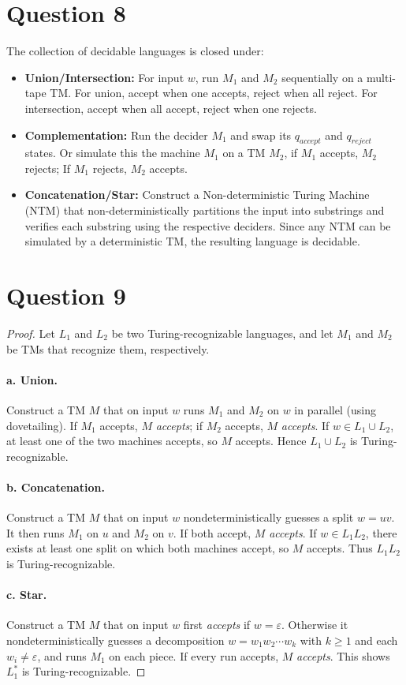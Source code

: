 \documentclass[a4paper, UTF-8]{article}
\theoremstyle{plain}
\begin{document}
\section{Question 8} 
The collection of decidable languages is closed under:
\begin{itemize}
    \item \textbf{Union/Intersection:} For input $w$, run $M_1$ and $M_2$ sequentially on a multi-tape TM. For union, accept when one accepts, reject when all reject. For intersection, accept when all accept, reject when one rejects.
    \item \textbf{Complementation:} Run the decider $M_1$ and swap its $q_{accept}$ and $q_{reject}$ states. Or simulate this the machine $M_1$ on a TM $M_2$, if $M_1$ accepts, $M_2$ rejects; If $M_1$ rejects, $M_2$ accepts.
    \item \textbf{Concatenation/Star:} Construct a Non-deterministic Turing Machine (NTM) that non-deterministically partitions the input into substrings and verifies each substring using the respective deciders. Since any NTM can be simulated by a deterministic TM, the resulting language is decidable.
\end{itemize}

\section{Question 9}

\begin{proof}
Let $L_1$ and $L_2$ be two Turing-recognizable languages, and let $M_1$ and $M_2$ be TMs that recognize them, respectively.

\paragraph{a. Union.}
Construct a TM $M$ that on input $w$ runs $M_1$ and $M_2$ on $w$ in parallel (using dovetailing). If $M_1$ accepts, $M$ \emph{accepts}; if $M_2$ accepts, $M$ \emph{accepts}. If $w \in L_1 \cup L_2$, at least one of the two machines accepts, so $M$ accepts. Hence $L_1 \cup L_2$ is Turing-recognizable.

\paragraph{b. Concatenation.}
Construct a TM $M$ that on input $w$ nondeterministically guesses a split $w = uv$. It then runs $M_1$ on $u$ and $M_2$ on $v$. If both accept, $M$ \emph{accepts}. If $w \in L_1 L_2$, there exists at least one split on which both machines accept, so $M$ accepts. Thus $L_1 L_2$ is Turing-recognizable.

\paragraph{c. Star.}
Construct a TM $M$ that on input $w$ first \emph{accepts} if $w = \varepsilon$. Otherwise it nondeterministically guesses a decomposition $w = w_1 w_2 \cdots w_k$ with $k \ge 1$ and each $w_i \neq \varepsilon$, and runs $M_1$ on each piece. If every run accepts, $M$ \emph{accepts}. This shows $L_1^*$ is Turing-recognizable.
\end{proof}
\end{document}
